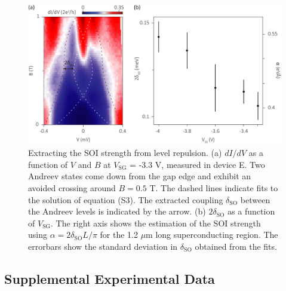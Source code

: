 \begin{figure}
\begin{center}
\includegraphics[width=0.7\columnwidth]{chapter_spinorbit/figures/SFig3_Anticrossing.pdf}
\caption{\label{fig:SOIlevelrep}
Extracting the SOI strength from level repulsion.
(a) $dI/dV$ as a function of $V$ and $B$ at $V_{\mathrm{SG}}$ = -3.3 V, measured in device E.
Two Andreev states come down from the gap edge and exhibit an avoided crossing around $B = 0.5$ T.
The dashed lines indicate fits to the solution of equation (S3).
The extracted coupling $\delta_{\mathrm{SO}}$ between the Andreev levels is indicated by the arrow.
(b) $2\delta_{\mathrm{SO}}$ as a function of $V_{\mathrm{SG}}$.
The right axis shows the estimation of the SOI strength using $\alpha = 2\delta_{\mathrm{SO}}L/\pi$ for the 1.2 $\mu$m long superconducting region.
The errorbars show the standard deviation in $\delta_{\mathrm{SO}}$ obtained from the fits.
}
\end{center}
\end{figure}

\clearpage
\subsection{Supplemental Experimental Data}

